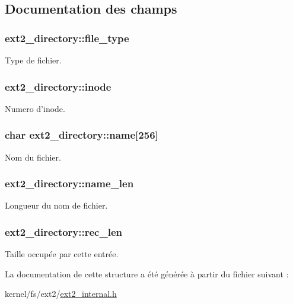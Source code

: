 \subsection{\-Documentation des champs}
\hypertarget{structext2__directory_a100a0ca76dac23225e9fbaa03b8925d0}{
\subsubsection[{file\-\_\-type}]{ {\bf ext2\-\_\-directory\-::file\-\_\-type}}}\label{structext2__directory_a100a0ca76dac23225e9fbaa03b8925d0}
\-Type de fichier. \hypertarget{structext2__directory_a58f91a7939507e98be75baed206c149c}{
\subsubsection[{inode}]{ {\bf ext2\-\_\-directory\-::inode}}}\label{structext2__directory_a58f91a7939507e98be75baed206c149c}
\-Numero d'inode. \hypertarget{structext2__directory_a68dde9644a76168693b569434ab17fd4}{
\subsubsection[{name}]{\setlength{\rightskip}{0pt plus 5cm}char {\bf ext2\-\_\-directory\-::name}\mbox{[}256\mbox{]}}}\label{structext2__directory_a68dde9644a76168693b569434ab17fd4}
\-Nom du fichier. \hypertarget{structext2__directory_ab2ab4e90da260d09d51d74abdaabb095}{
\subsubsection[{name\-\_\-len}]{ {\bf ext2\-\_\-directory\-::name\-\_\-len}}}\label{structext2__directory_ab2ab4e90da260d09d51d74abdaabb095}
\-Longueur du nom de fichier. \hypertarget{structext2__directory_a349e610d4d226a480c577c94b09a5eaf}{
\subsubsection[{rec\-\_\-len}]{ {\bf ext2\-\_\-directory\-::rec\-\_\-len}}}\label{structext2__directory_a349e610d4d226a480c577c94b09a5eaf}
\-Taille occupée par cette entrée. 

\-La documentation de cette structure a été générée à partir du fichier suivant \-:\begin{DoxyCompactItemize}
\item 
kernel/fs/ext2/\hyperlink{ext2__internal_8h}{ext2\-\_\-internal.\-h}\end{DoxyCompactItemize}
